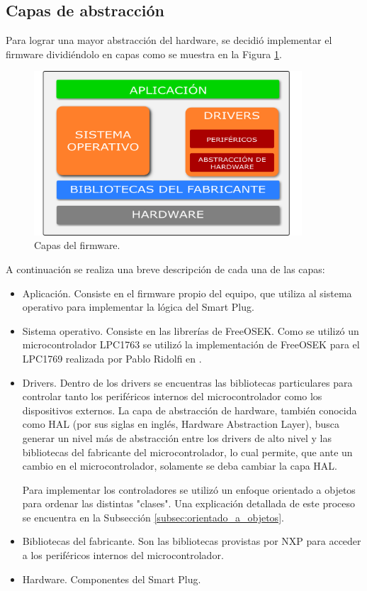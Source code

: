 \subsection{Capas de abstracción}

Para lograr una mayor abstracción del hardware, se decidió implementar el firmware dividiéndolo en capas como se muestra en la Figura \ref{fig:firmware_diagrama_capas}.

\begin{figure}[h]
	\centering
	\includegraphics[width=10cm]{./Figures/3_2_2_firmware_diagrama_capas.png}
	\caption{Capas del firmware.}
	\label{fig:firmware_diagrama_capas}
\end{figure}

A continuación se realiza una breve descripción de cada una de las capas:

\begin{itemize}
\item Aplicación. Consiste en el firmware propio del equipo, que utiliza al sistema operativo para implementar la lógica del Smart Plug.
\item Sistema operativo. Consiste en las librerías de FreeOSEK. Como se utilizó un microcontrolador LPC1763 se utilizó la implementación de FreeOSEK para el LPC1769 realizada por Pablo Ridolfi en \citep{repo_ridolfi_freeosek}.
\item Drivers. Dentro de los drivers se encuentras las bibliotecas particulares para controlar tanto los periféricos internos del microcontrolador como los dispositivos externos. La capa de abstracción de hardware, también conocida como HAL (por sus siglas en inglés, Hardware Abstraction Layer), busca generar un nivel más de abstracción entre los drivers de alto nivel y las bibliotecas del fabricante del microcontrolador, lo cual permite, que ante un cambio en el microcontrolador, solamente se deba cambiar la capa HAL.

Para implementar los controladores se utilizó un enfoque orientado a objetos para ordenar las distintas "clases". Una explicación detallada de este proceso se encuentra en la Subsección \ref{subsec:orientado_a_objetos}.
\item Bibliotecas del fabricante. Son las bibliotecas provistas por NXP para acceder a los periféricos internos del microcontrolador.
\item Hardware. Componentes del Smart Plug.
\end{itemize}

